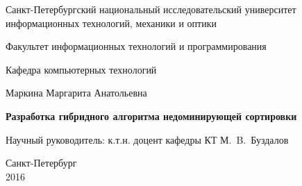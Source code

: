\documentclass[a4paper]{report}
\theoremstyle{plain}
\theoremstyle{definition}
\numberwithin{theorem}{chapter}        %
\begin{document}
 \renewcommand{\thelstlisting}{\thesection.\arabic{lstlisting}}
\initializefrontsections

\pagestyle{title}

\begin{center}
Санкт-Петербургский национальный исследовательский университет \\ информационных технологий, механики и оптики

\vspace{2cm}

Факультет информационных технологий и программирования

Кафедра компьютерных технологий

\vspace{3cm}

{\Large Маркина Маргарита Анатольевна}

\vspace{2cm}

\vbox{\LARGE\bfseries
Разработка гибридного алгоритма недоминирующей сортировки
}

\vspace{4cm}

{\Large Научный руководитель: к.т.н. доцент кафедры КТ М.~B.~Буздалов}

\vspace{6cm}

Санкт-Петербург\\ 2016
\end{center}

\newpage

\setcounter{page}{3}
\pagestyle{plain}

\tableofcontents

\startthechapters







\printbibliography

%
\end{document}
